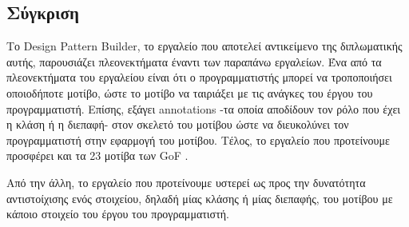 \subsection{Σύγκριση}
\label{subsec:compare}
Το Design Pattern Builder, το εργαλείο που αποτελεί αντικείμενο 
της διπλωματικής αυτής, παρουσιάζει πλεονεκτήματα έναντι των παραπάνω εργαλείων.
Ένα από τα πλεονεκτήματα του εργαλείου είναι ότι ο προγραμματιστής μπορεί να τροποποιήσει οποιοδήποτε μοτίβο, 
ώστε το μοτίβο να ταιριάξει με τις ανάγκες του έργου του προγραμματιστή. 
Επίσης, εξάγει annotations -τα οποία αποδίδουν τον ρόλο που έχει η κλάση ή η διεπαφή-  
στον σκελετό του μοτίβου ώστε να διευκολύνει τον προγραμματιστή 
στην εφαρμογή του μοτίβου. 
Τέλος, το εργαλείο που προτείνουμε προσφέρει και τα 23 μοτίβα των GoF \cite{GoF}.
\par
Από την άλλη, το εργαλείο που προτείνουμε υστερεί ως προς την δυνατότητα 
αντιστοίχισης ενός στοιχείου, δηλαδή μίας κλάσης ή μίας διεπαφής, του μοτίβου με κάποιο στοιχείο 
του έργου του προγραμματιστή. 
